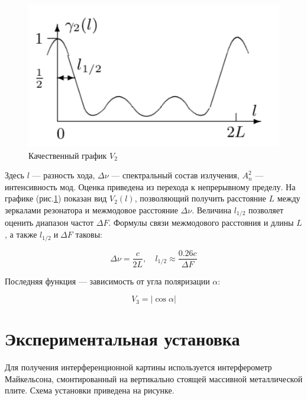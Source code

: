 \documentclass[12pt,a4paper]{article}
\begin{document}
    \begin{figure} 
    	\includegraphics[width=\linewidth]{res/v2.png}
    	\caption{Качественный график $ V_2 $}
    	\label{V2graf}
    \end{figure}
    
    
    Здесь $ l $ --- разность хода, $ \Delta\nu $ --- спектральный состав излучения, $ A_n^2 $ --- интенсивность мод. Оценка приведена из перехода к непрерывному пределу. На графике (рис.\ref{V2graf}) показан вид $ V_2(l) $, позволяющий получить расстояние $ L $ между зеркалами резонатора и межмодовое расстояние $ \Delta \nu $. Величина $ l_{1/2} $  позволяет оценить диапазон частот $ \Delta F $.
    Формулы связи межмодового расстояния и длины $ L $, а также $ l_{1/2} \; \text{и} \; \Delta F $ таковы:
    
    \begin{equation}\label{dnu}
    \Delta \nu = \dfrac{c}{2L}, \quad l_{1/2} \approx \dfrac{0.26 c}{\Delta F}
    \end{equation}
    
    Последняя функция --- зависимость от угла поляризации $ \alpha $:
    
    \begin{equation}\label{}
    V_3 = |\cos{\alpha}|
    \end{equation}

	
	\section*{Экспериментальная установка}

    Для получения интерференционной картины используется интерферометр Майкельсона, смонтированный на вертикально стоящей массивной металлической плите. Схема установки приведена на рисунке.
    
\end{document}
